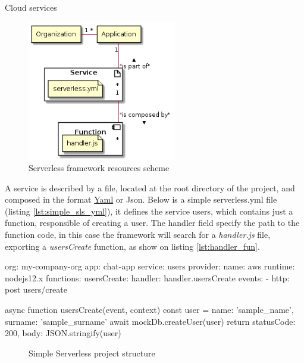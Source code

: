 \begin{chapter}{Cloud services}
    \begin{figure}
        \centering
        \includegraphics[width=6.5cm]{source/diagrams/serverless_app_service.png}
        \caption{Serverless framework resources scheme}
        \label{fig:sls_resource_scheme}
    \end{figure}

    A service is described by a file, located at the root directory of the project,
    and composed in the format \href{https://yaml.org/}{Yaml} or Json.
    Below is a simple serverless.yml file (listing \ref{lst:simple_sls_yml}), it
    defines the service users, which contains just a function, responsible of creating
    a user. The handler field specify the path to the function code, in this case
    the framework will search for a \textit{handler.js} file, exporting a
    \textit{usersCreate} function, as show on listing \ref{lst:handler_fun}.

    \bigskip
    \begin{code}[caption=Simple serverless.yml file,
        label={lst:simple_sls_yml}, language=yaml]
org: my-company-org
app: chat-app
service: users
provider:
  name: aws
  runtime: nodejs12.x
functions:
  usersCreate:
    handler: handler.usersCreate
    events:
      - http: post users/create
    \end{code}

    \begin{code}[caption=Simple handler function,label={lst:handler_fun}]
async function usersCreate(event, context) {
  const user = {
    name: 'sample_name',
    surname: 'sample_surname'
  }
  await mockDb.createUser(user)
  return {
    statusCode: 200,
    body: JSON.stringify({user})
  }
}
    \end{code}

    \begin{figure}
        \begin{minipage}{\linewidth}
        \end{minipage}
        \caption{Simple Serverless project structure}
        \label{fig:sls_project_structure}
    \end{figure}


\end{chapter}
